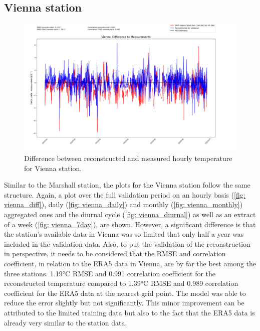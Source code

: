 \subsection*{Vienna station}
\begin{figure}[H]
\centering
\includegraphics[width=1.00\textwidth]{resources/images/charts/vienna_eval_grib_final/Vienna, Difference to Measurements.png}
\caption{Difference between reconstructed and measured hourly temperature for Vienna station.}
\label{fig: vienna_diff}
\end{figure}

Similar to the Marshall station, the plots for the Vienna station follow the same structure.
Again, a plot over the full validation period on an hourly basis (\autoref{fig: vienna_diff}), daily (\autoref{fig: vienna_daily}) and monthly (\autoref{fig: vienna_monthly}) aggregated ones and the diurnal cycle (\autoref{fig: vienna_diurnal}) as well as an extract of a week (\autoref{fig: vienna_7day}), are shown.
However, a significant difference is that the station's available data in Vienna was so limited that only half a year was included in the validation data.
Also, to put the validation of the reconstruction in perspective, it needs to be considered that the RMSE and correlation coefficient, in relation to the ERA5 data in Vienna, are by far the best among the three stations.
1.19°C RMSE and 0.991 correlation coefficient for the reconstructed temperature compared to 1.39°C RMSE and 0.989 correlation coefficient for the ERA5 data at the nearest grid point.
The model was able to reduce the error slightly but not significantly.
This minor improvement can be attributed to the limited training data but also to the fact that the ERA5 data is already very similar to the station data.

